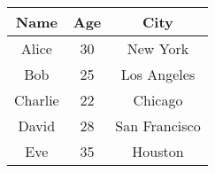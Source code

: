 \begin{tabular}{|c|c|c|}
\hline
Name & Age & City \\
\hline
Alice & 30 & New York \\
\hline
Bob & 25 & Los Angeles \\
\hline
Charlie & 22 & Chicago \\
\hline
David & 28 & San Francisco \\
\hline
Eve & 35 & Houston \\
\hline
\end{tabular}
